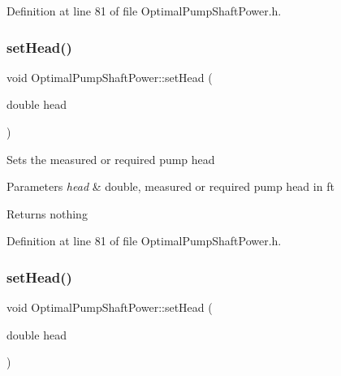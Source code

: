 Definition at line 81 of file Optimal\+Pump\+Shaft\+Power.\+h.

\mbox{\label{class_optimal_pump_shaft_power_aa080c62ff92fc70a4e27e7710e490b62}} 
\subsubsection{\texorpdfstring{set\+Head()}{setHead()}\hspace{0.1cm}{\footnotesize\ttfamily [2/3]}}
{\footnotesize\ttfamily void Optimal\+Pump\+Shaft\+Power\+::set\+Head (\begin{DoxyParamCaption}\item[{double}]{head }\end{DoxyParamCaption})\hspace{0.3cm}{\ttfamily [inline]}}

Sets the measured or required pump head


\begin{DoxyParams}{Parameters}
{\em head} & double, measured or required pump head in ft\\
\hline
\end{DoxyParams}
\begin{DoxyReturn}{Returns}
nothing 
\end{DoxyReturn}


Definition at line 81 of file Optimal\+Pump\+Shaft\+Power.\+h.

\mbox{\label{class_optimal_pump_shaft_power_aa080c62ff92fc70a4e27e7710e490b62}} 
\subsubsection{\texorpdfstring{set\+Head()}{setHead()}\hspace{0.1cm}{\footnotesize\ttfamily [3/3]}}
{\footnotesize\ttfamily void Optimal\+Pump\+Shaft\+Power\+::set\+Head (\begin{DoxyParamCaption}\item[{double}]{head }\end{DoxyParamCaption})\hspace{0.3cm}{\ttfamily [inline]}}

